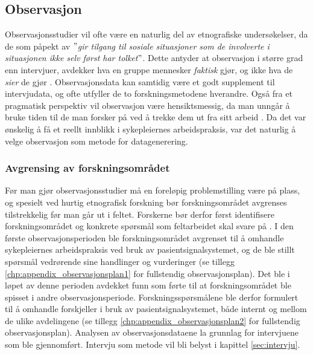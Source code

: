\subsection{Observasjon}
\label{section:observasjon}
 
Observasjonsstudier vil ofte være en naturlig del av etnografiske undersøkelser, da de som påpekt av \citet{Tjora} \textit{$"$gir tilgang til sosiale situasjoner som de involverte i situasjonen ikke selv først har tolket$"$}. Dette antyder at observasjon i større grad enn intervjuer, avdekker hva en gruppe mennesker \textit{faktisk} gjør, og ikke hva de \textit{sier} de gjør \citep{Oates, Blomberg93, Tjora}. Observasjonsdata kan samtidig være et godt supplement til intervjudata, og ofte utfyller de to forskningsmetodene hverandre. Også fra et pragmatisk perspektiv vil observasjon være hensiktsmessig, da man unngår å bruke tiden til de man forsker på ved å trekke dem ut fra sitt arbeid \citep{Tjora}. Da det var ønskelig å få et reellt innblikk i sykepleiernes arbeidspraksis, var det naturlig å velge observasjon som metode for datagenerering.
 
\noindent
\subsubsection{Avgrensing av forskningsområdet}
Før man gjør observasjonsstudier må en foreløpig problemstilling være på plass, og spesielt ved hurtig etnografisk forskning bør forskningsområdet avgrenses tilstrekkelig før man går ut i feltet. Forskerne bør derfor først identifisere forskningsområdet og konkrete spørsmål som feltarbeidet skal svare på \citep{Tjora, Millen00}. I den første observasjonsperioden ble forskningsområdet avgrenset til å omhandle sykepleiernes arbeidspraksis ved bruk av pasientsignalsystemet, og de ble stillt spørsmål vedrørende sine handlinger og vurderinger (se tillegg \ref{chp:appendix_observasjonsplan1} for fullstendig observasjonsplan). Det ble i løpet av denne perioden avdekket funn som førte til at forskningsområdet ble spisset i andre observasjonsperiode. Forskningsspørsmålene ble derfor formulert til å omhandle forskjeller i bruk av pasientsignalsystemet, både internt og mellom de ulike avdelingene (se tillegg \ref{chp:appendix_observasjonsplan2} for fullstendig observasjonsplan). Analysen av observasjonsdataene la grunnlag for intervjuene som ble gjennomført. Intervju som metode vil bli belyst i kapittel \ref{sec:intervju}.

